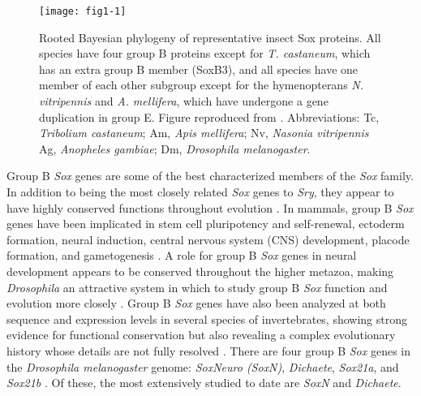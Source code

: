 \begin{figure}
\centering
\texttt{[image: fig1-1]}
\caption[Rooted Bayesian phylogeny of insect Sox proteins]{Rooted Bayesian phylogeny of representative insect Sox proteins. All species have four group B proteins except for \emph{T. castaneum}, which has an extra group B member (SoxB3), and all species have one member of each other subgroup except for the hymenopterans \emph{N. vitripennis} and \emph{A. mellifera}, which have undergone a gene duplication in group E. Figure reproduced from \citet{wilson_evolution_2008}. Abbreviations: Tc, \emph{Tribolium castaneum}; Am, \emph{Apis mellifera}; Nv, \emph{Nasonia vitripennis} Ag, \emph{Anopheles gambiae}; Dm, \emph{Drosophila melanogaster}.}
\label{Figure 1.1}
\end{figure}

Group B \emph{Sox} genes are some of the best characterized members of the \emph{Sox} family. In addition to being the most closely related \emph{Sox} genes to \emph{Sry}, they appear to have highly conserved functions throughout evolution \citep{collignon_comparison_1996,mckimmie_conserved_2005}. In mammals, group B \emph{Sox} genes have been implicated in stem cell pluripotency and self-renewal, ectoderm formation, neural induction, central nervous system (CNS) development, placode formation, and gametogenesis \citep{guth_having_2008}. A role for group B \emph{Sox} genes in neural development appears to be conserved throughout the higher metazoa, making \emph{Drosophila} an attractive system in which to study group B \emph{Sox} function and evolution more closely \citep{uwanogho_embryonic_1995,wood_comparative_1999,wegner_stem_2005}. Group B \emph{Sox} genes have also been analyzed at both sequence and expression levels in several species of invertebrates, showing strong evidence for functional conservation but also revealing a complex evolutionary history whose details are not fully resolved \citep{wilson_evolution_2008,mckimmie_conserved_2005,wei_identification_2010,pioro_expression_2006,zhong_parallel_2011}. There are four group B \emph{Sox} genes in the \emph{Drosophila melanogaster} genome: \emph{SoxNeuro (SoxN)}, \emph{Dichaete}, \emph{Sox21a}, and \emph{Sox21b} \citep{mckimmie_conserved_2005}. Of these, the most extensively studied to date are \emph{SoxN} and \emph{Dichaete}.

